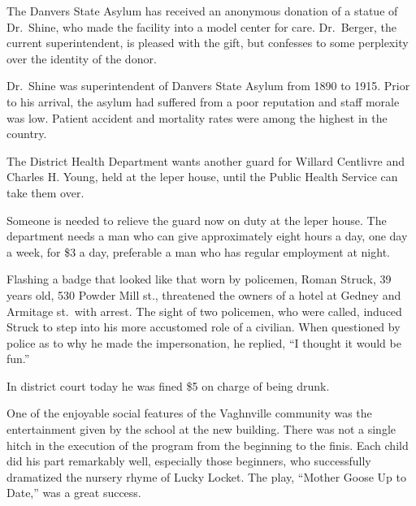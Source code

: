 \documentclass{newspaper1920}
\begin{document}
\begin{multicols}{3}
\halfrule


The Danvers State Asylum has received an anonymous donation of a
statue of Dr.~Shine, who made the facility into a model center for
care.  Dr.~Berger, the current superintendent, is pleased with the
gift, but confesses to some perplexity over the identity of the donor.

Dr.~Shine was superintendent of Danvers State Asylum from 1890 to
1915.  Prior to his arrival, the asylum had suffered from a poor
reputation and staff morale was low.  Patient accident and mortality
rates were among the highest in the country.

\halfrule


The District Health Department wants another guard for Willard
Centlivre and Charles H. Young, held at the leper house, until the
Public Health Service can take them over.

Someone is needed to relieve the guard now on duty at the leper house.
The department needs a man who can give approximately eight hours a
day, one day a week, for \$3 a day, preferable a man who has regular
employment at night.

\halfrule


Flashing a badge that looked like that worn by policemen, Roman
Struck, 39 years old, 530 Powder Mill st., threatened the owners of a
hotel at Gedney and Armitage st.\ with arrest.  The sight of two
policemen, who were called, induced Struck to step into his more
accustomed role of a civilian.  When questioned by police as to why he
made the impersonation, he replied, ``I thought it would be fun.''

In district court today he was fined \$5 on charge of being drunk.

\halfrule


One of the enjoyable social features of the Vaghnville community was
the entertainment given by the school at the new building.  There was
not a single hitch in the execution of the program from the beginning
to the finis.  Each child did his part remarkably well, especially
those beginners, who successfully dramatized the nursery rhyme of
Lucky Locket.  The play, ``Mother Goose Up to Date,'' was a great
success.

\end{multicols}
\end{document}
